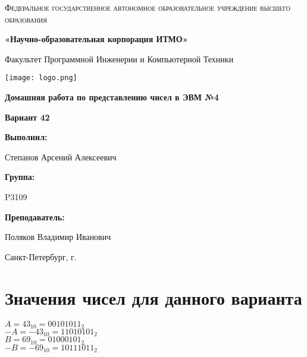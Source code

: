 \documentclass[12pt,a4paper]{report}
\begin{document}
\begin{titlepage}
	\centering
	{
        \scshape
        Федеральное государственное автономное образовательное учреждение высшего образования
        \par
        \textbf{«Научно-образовательная корпорация ИТМО»}
        \par
        \vspace*{1cm}
        Факультет Программной Инженерии и Компьютерной Техники
        \par
    }
    \vspace*{0.6cm}
    \texttt{[image: logo.png]}
    {
        \Large
        \textbf{Домашняя работа по представлению чисел в ЭВМ №4}
        \par
        \normalsize
        \vspace*{0.75cm}
        \textbf{Вариант 42}
        \par
    }
    \vfill
    \hfill\begin{minipage}{\dimexpr\textwidth-7.8cm}
        \textbf{Выполнил:}\par
        Степанов Арсений Алексеевич\par
        \vspace*{0.15cm}
        \textbf{Группа:}\par
        P3109\par
        \vspace*{0.15cm}
        \textbf{Преподаватель:}\par
        Поляков Владимир Иванович\par
    \end{minipage}
    \vfill
    Санкт-Петербург, \the\year{}г.
\end{titlepage}
\section*{Значения чисел для данного варианта}
\onehalfspacing
$A=43_{10}=00101011_2$\\
$-A=-43_{10}=11010101_2$\\
$B=69_{10}=01000101_2$\\
$-B=-69_{10}=10111011_2$\\
\end{document}
